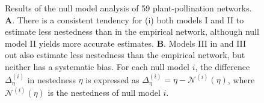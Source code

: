 \begin{figure}[bp]

   \caption{Results of the null model analysis of 59 plant-pollination networks.
   \textbf{A}. There is a consistent tendency for (i) both models I and II to
   estimate less nestedness than in the empirical network, although null model
   II yields more accurate estimates. \textbf{B}. Models III in and III out also
   estimate less nestedness than the empirical network, but neither has a
   systematic bias. For each null model $i$, the difference $\Delta^{(i)}_\eta$
   in nestedness $\eta$ is expressed as $\Delta^{(i)}_\eta =
   \eta-\mathcal{N}^{(i)}(\eta)$, where $\mathcal{N}^{(i)}(\eta)$ is the
   nestedness of null model $i$.}

   \label{f:app2}
\end{figure}
